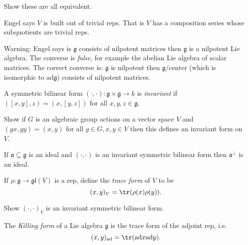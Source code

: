 \documentclass[a4paper]{article}
\newcommand*{\Lie}[1]{\mathfrak{#1}} %
\newcommand{\ad}{\mathrm{ad}} %
\begin{document}
\begin{ex}
  Show these are all equivalent.
\end{ex}

Engel says \(V\) is built out of trivial reps. That is \(V\) has a composition series whose subquotients are trivial reps.

Warning: Engel says is \(\Lie g\) consists of nilpotent matrices then \(\Lie g\) is a nilpotent Lie algebra. The converse is \emph{false}, for example the abelian Lie algebra of scalar matrices. The correct converse is: \(\Lie g\) is nilpotent then \(\Lie g/\text{center}\) (which is isomorphic to \(\ad \Lie g\)) consists of nilpotent matrices.

\begin{definition}
  A symmetric bilinear form \((\cdot, \cdot): \Lie g \times \Lie g \to k\) is \emph{invariant} if \(([x, y], z) = (x, [y, z])\) for all \(x, y, z \in \Lie g\).
\end{definition}

\begin{ex}
  Show if \(G\) is an algebraic group actions on a vector space \(V\) and \((gx, gy) = (x, y)\) for all \(g \in G, x, y \in V\) then this defines an invariant form on \(V\).
\end{ex}

\begin{ex}
  If \(\mathfrak a \subseteq \Lie g\) is an ideal and \((\cdot, \cdot)\) is an invariant symmetric bilinear form then \(\mathfrak a^\perp\) is an ideal.
\end{ex}

\begin{definition}
  If \(\rho: \Lie g \to \Lie{gl}(V)\) is a rep, define the \emph{trace form} of \(V\) to be
  \[
    (x, y)_V = \tr (\rho(x) \rho(y)).
  \]
\end{definition}

\begin{ex}
  Show \((\cdot, \cdot)_V\) is an invariant symmetric bilinear form.
\end{ex}

\begin{definition}
  The \emph{Killing form} of a Lie algebra \(\Lie g\) is the trace form of the adjoint rep, i.e.
  \[
    (x, y)_{\ad} = \tr (\ad x \ad y).
  \]
\end{definition}
\end{document}
